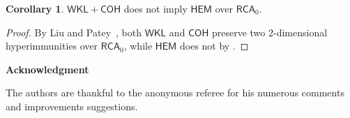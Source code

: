 \documentclass{article}
\newcommand{\RCA}[0]{\mathsf{RCA}}
\newcommand{\WKL}[0]{\mathsf{WKL}}
\newcommand{\COH}{\mathsf{COH}}
\newcommand{\HEM}{\mathsf{HEM}}
\numberwithin{theorem}{section}
\theoremstyle{definition}
\newtheorem{corollary}[theorem]{Corollary}
\begin{document}
\begin{corollary}
$\WKL + \COH$ does not imply $\HEM$ over $\RCA_0$.
\end{corollary}
\begin{proof}
By Liu and Patey~\cite[Corollary 2.7, Corollary 2.9]{liu2022reverse}, both $\WKL$ and $\COH$ preserve two 2-dimensional hyperimmunities over $\RCA_0$, while $\HEM$ does not by .
\end{proof}


\begin{center}
\textbf{Acknowledgment}
\end{center}
The authors are thankful to the anonymous referee for his numerous comments and improvements suggestions.





\end{document}
